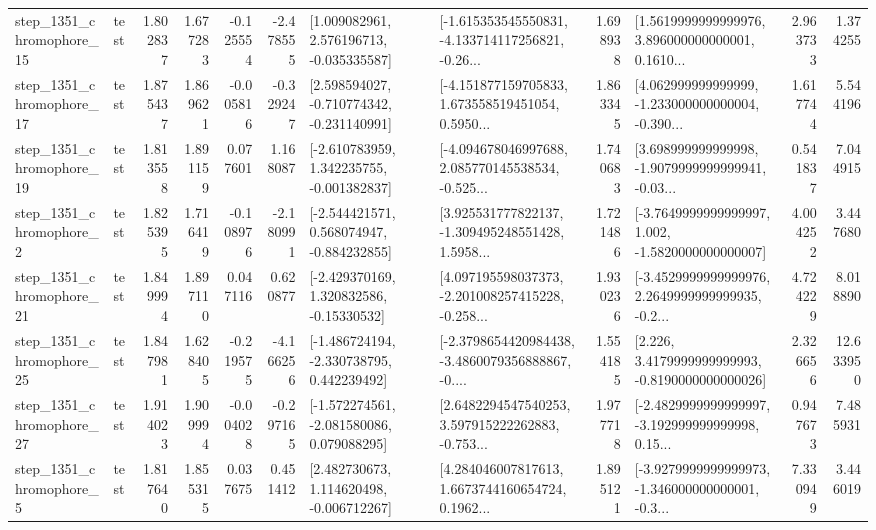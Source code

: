 \begin{tabular}{llrrrrllrlrr}
 step\_1351\_chromophore\_15 &      test &      1.802837 &    1.677283 &     -0.125554 & -2.478555 &    [1.009082961, 2.576196713, -0.035335587] &  [-1.615353545550831, -4.133714117256821, -0.26... &       1.698938 &  [1.5619999999999976, 3.896000000000001, 0.1610... &            2.963733 &          1.374255 \\
 step\_1351\_chromophore\_17 &      test &      1.875437 &    1.869621 &     -0.005816 & -0.329247 &   [2.598594027, -0.710774342, -0.231140991] &  [-4.151877159705833, 1.673558519451054, 0.5950... &       1.863345 &  [4.062999999999999, -1.233000000000004, -0.390... &            1.617744 &          5.544196 \\
 step\_1351\_chromophore\_19 &      test &      1.813558 &    1.891159 &      0.077601 &  1.168087 &   [-2.610783959, 1.342235755, -0.001382837] &  [-4.094678046997688, 2.085770145538534, -0.525... &       1.740683 &  [3.698999999999998, -1.9079999999999941, -0.03... &            0.541837 &          7.044915 \\
  step\_1351\_chromophore\_2 &      test &      1.825395 &    1.716419 &     -0.108976 & -2.180991 &   [-2.544421571, 0.568074947, -0.884232855] &  [3.925531777822137, -1.309495248551428, 1.5958... &       1.721486 &  [-3.7649999999999997, 1.002, -1.5820000000000007] &            4.004252 &          3.447680 \\
 step\_1351\_chromophore\_21 &      test &      1.849994 &    1.897110 &      0.047116 &  0.620877 &    [-2.429370169, 1.320832586, -0.15330532] &  [4.097195598037373, -2.201008257415228, -0.258... &       1.930236 &  [-3.4529999999999976, 2.2649999999999935, -0.2... &            4.724229 &          8.018890 \\
 step\_1351\_chromophore\_25 &      test &      1.847981 &    1.628405 &     -0.219575 & -4.166256 &   [-1.486724194, -2.330738795, 0.442239492] &  [-2.3798654420984438, -3.4860079356888867, -0.... &       1.554185 &   [2.226, 3.4179999999999993, -0.8190000000000026] &            2.326656 &         12.633950 \\
 step\_1351\_chromophore\_27 &      test &      1.914023 &    1.909994 &     -0.004028 & -0.297165 &   [-1.572274561, -2.081580086, 0.079088295] &  [2.6482294547540253, 3.597915222262883, -0.753... &       1.977718 &  [-2.4829999999999997, -3.192999999999998, 0.15... &            0.947673 &          7.485931 \\
  step\_1351\_chromophore\_5 &      test &      1.817640 &    1.855315 &      0.037675 &  0.451412 &    [2.482730673, 1.114620498, -0.006712267] &  [4.284046007817613, 1.6673744160654724, 0.1962... &       1.895121 &  [-3.9279999999999973, -1.346000000000001, -0.3... &            7.330949 &          3.446019 \\

\end{tabular}
